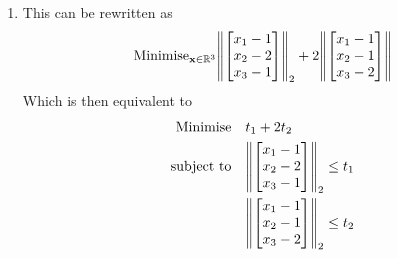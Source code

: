\begin{enumerate}
\begin{enumerate}[label=(\arabic*)]
\begin{align*}
                                                & \fx \geq 0.
                    \end{align*}
                    which is a conic program (indeed a second order cone program).
                    \begin{align*}
                        \text{Minimise} \quad   & t                                      \\
                        \text{subject to} \quad & \begin{bmatrix}
                            \frac{(x_1 + t + 1)}{2} \\ \fx \\ \frac{(x_1 + t - 1)}{2}
                        \end{bmatrix} \in \SOC^5 \\
                                                & \frac{1}{\fx} \in \SOC^4               \\
                        x_i \in \SOC^1, i = 1, 2, 3.
                    \end{align*}
              \item This can be rewritten as
                    \[\text{Minimise}_{\mathbf{x} \in \mathbb{R}^3} \norm{\begin{bmatrix} x_1 - 1 \\ x_2 - 2 \\ x_3 - 1\end{bmatrix}}_2 + 2 \norm{\begin{bmatrix} x_1 - 1 \\ x_2 - 1 \\ x_3 - 2\end{bmatrix}}\]
                    Which is then equivalent to
                    \begin{align*}
                        \text{Minimise} \quad   & t_1 + 2t_2                                    \\
                        \text{subject to} \quad & \norm{\begin{bmatrix} x_1 - 1 \\ x_2 - 2 \\ x_3 - 1\end{bmatrix}}_2 \leq t_1 \\
                                                & \norm{\begin{bmatrix} x_1 - 1 \\ x_2 - 1 \\ x_3 - 2\end{bmatrix}}_2 \leq t_2
                    \end{align*}

\end{enumerate}
\end{enumerate}
